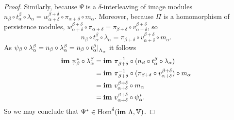 \begin{proof}
  Similarly, because $\Psi$ is a $\delta$-interleaving of image modules $n_\beta\circ t_\alpha^\beta\circ \lambda_\alpha = w_{\alpha+\delta}^{\beta+\delta}\circ\pi_{\alpha+\delta}\circ m_\alpha$.
  Moreover, because $\Pi$ is a homomorphism of persistence modules, $w_{\alpha+\delta}^{\beta+\delta}\circ\pi_{\alpha+\delta} = \pi_{\beta+\delta}\circ v_{\alpha+\delta}^{\beta+\delta}$, so
  \[ n_\beta\circ t_\alpha^\beta\circ \lambda_\alpha = \pi_{\beta+\delta}\circ v_{\alpha+\delta}^{\beta+\delta}\circ m_\alpha.\]
  As $\psi_\beta\circ\lambda_\alpha^\beta = n_\beta\circ\lambda_\alpha^\beta = n_\beta\circ t_\alpha^\beta\mathord{\mid}_{\Lambda_\alpha}$ it follows
  \begin{align*}
    \mathbf{im}~\psi_\beta^*\circ\lambda_\alpha^\beta &= \mathbf{im}~\pi^{-1}_{\beta+\delta}\circ (n_\beta\circ t_\alpha^\beta\circ\lambda_\alpha)\\
      &= \mathbf{im}~\pi^{-1}_{\beta+\delta}\circ (\pi_{\beta+\delta}\circ v_{\alpha+\delta}^{\beta+\delta})\circ m_\alpha\\
      &= \mathbf{im}~v_{\alpha+\delta}^{\beta+\delta}\circ m_\alpha\\
      &= \mathbf{im}~v_{\alpha+\delta}^{\beta+\delta}\circ\psi_\alpha^*.
  \end{align*}
  So we may conclude that $\Psi^*\in\text{Hom}^\delta(\mathbf{im}~\Lambda,\mathbb{V})$.


\end{proof}
